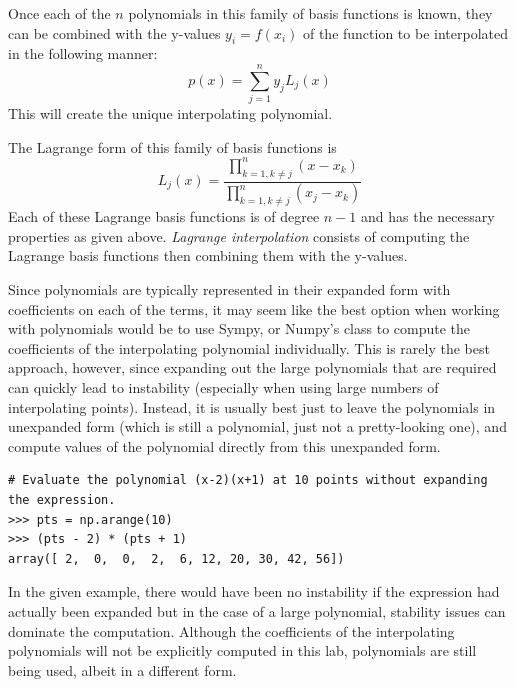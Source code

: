 Once each of the $n$ polynomials in this family of basis functions is known, they can be combined with the y-values $y_i=f(x_i)$ of the function to be interpolated in the following manner:
\begin{equation}
\label{equa:poly}
p(x) = \sum_{j=1}^n y_j L_j(x)
\end{equation}
This will create the unique interpolating polynomial.

The Lagrange form of this family of basis functions is
\begin{equation}
\label{equa:lagrange}
L_j(x) = \frac{\displaystyle\prod_{k=1, k \neq j}^n (x-x_k)}{\displaystyle\prod_{k=1, k \neq j}^n (x_j-x_k)}
\end{equation}
Each of these Lagrange basis functions is of degree $n-1$ and has the necessary properties as given above.
\emph{Lagrange interpolation} consists of computing the Lagrange basis functions then combining them with the y-values.

Since polynomials are typically represented in their expanded form with coefficients on each of the terms, it may seem like the best option when working with polynomials would be to use Sympy, or Numpy's
 class to compute the coefficients of the interpolating polynomial individually.
This is rarely the best approach, however, since expanding out the large polynomials that are required can quickly lead to instability (especially when using large 
numbers of interpolating points).
Instead, it is usually best just to leave the polynomials in unexpanded form (which is still a polynomial, just not a pretty-looking one), and compute values of the polynomial directly from this unexpanded form. 

\begin{lstlisting}
# Evaluate the polynomial (x-2)(x+1) at 10 points without expanding the expression.
>>> pts = np.arange(10)
>>> (pts - 2) * (pts + 1)
array([ 2,  0,  0,  2,  6, 12, 20, 30, 42, 56])
\end{lstlisting}
In the given example, there would have been no instability if the expression had actually been expanded but in the case of a large polynomial, stability issues can dominate the computation.
Although the coefficients of the interpolating polynomials will not be explicitly computed in this lab, polynomials are still being used, albeit in a different form.

